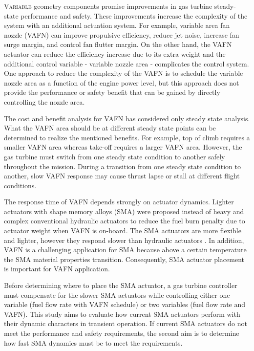 
\lettrine[nindent=0pt]{V}{ariable} geometry components promise improvements
in gas turbine steady-state performance and safety. These improvements 
increase the complexity of the system with an additional actuation system. For
example, variable area fan nozzle (VAFN) can improve propulsive efficiency, reduce jet noise, increase fan 
surge margin, and control fan flutter margin. On the other hand, the VAFN 
actuator can reduce the efficiency increase due to its extra weight and 
the additional control variable - variable nozzle area - complicates the control 
system. One approach to reduce the complexity of the VAFN is to schedule the
variable nozzle area as a function of the engine power level,
but this approach does not provide the performance or
safety benefit that can be gained by directly controlling the nozzle area.

The cost and benefit analysis for VAFN has considered only steady state analysis. What the VAFN area should be at different steady state points can be 
determined to realize the mentioned benefits. For example, top of climb requires 
a smaller VAFN area whereas take-off requires a larger VAFN area. However, the
gas turbine must switch from one steady state condition to another safely 
throughout the mission. During a transition from one steady state condition to 
another, slow VAFN response may cause thrust lapse or stall at different flight 
conditions.

The response time of VAFN depends strongly on actuator dynamics. Lighter 
actuators with shape memory alloys (SMA) \cite{Mabe:2008,Mabe:2008:Paris} 
were proposed instead of heavy and complex conventional hydraulic actuators to
reduce the fuel burn penalty due to actuator weight when VAFN is on-board. 
The SMA actuators are more flexible and lighter, however they respond slower 
than hydraulic actuators \cite{Rey:2001,Barooah:2002,Song:2007}. In addition, 
VAFN is a challenging application for SMA because above a certain temperature the
SMA material properties transition. Consequently, SMA actuator placement is 
important for VAFN application.

Before determining where to place the SMA actuator, a gas turbine controller 
must compensate for the slower SMA actuators while controlling either one 
variable (fuel flow rate with VAFN schedule) or two variables (fuel flow rate and 
VAFN). This study aims to evaluate how current SMA actuators perform with 
their dynamic characters in transient operation. If current SMA actuators do not 
meet the performance and safety requirements, the second aim is to determine 
how fast SMA dynamics must be to meet the requirements.

